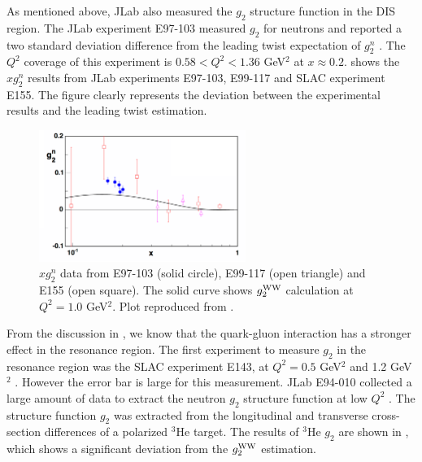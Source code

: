 As mentioned above, JLab also measured the $g_2$ structure function in the DIS region. The JLab experiment E97-103 measured $g_2$ for neutrons and reported a two standard deviation difference from the leading twist expectation of $g_2^n$ \cite{Kramer2005}. The $Q^2$ coverage of this experiment is $0.58<Q^2<1.36$ GeV${}^2$ at $x\approx0.2$.  shows the $xg_2^n$ results from JLab experiments E97-103, E99-117 \cite{Zheng2004} and SLAC experiment E155. The figure clearly represents the deviation between the experimental results and the leading twist estimation.

\begin{figure}[tb!]
  \centering
  \includegraphics[width=0.6\textwidth]{figs/xg2n_E97103.png}
  \caption[$xg_2^n$ data from E97-103.]{$xg_2^n$ data from E97-103 (solid circle), E99-117 (open triangle) and E155 (open square). The solid curve shows $g_2^{\mathrm{WW}}$ calculation at $Q^2=1.0$ GeV${}^2$. Plot reproduced from \cite{Kramer2005}. \label{C4S1F2}}
\end{figure}

From the discussion in , we know that the quark-gluon interaction has a stronger effect in the resonance region. The first experiment to measure $g_2$ in the resonance region was the SLAC experiment E143, at $Q^2=0.5$ GeV${}^2$ and 1.2 GeV${}^2$ \cite{Abe1998}. However the error bar is large for this measurement. JLab E94-010 collected a large amount of data to extract the neutron $g_2$ structure function at low $Q^2$ \cite{Amarian2004a}. The structure function $g_2$ was extracted from the longitudinal and transverse cross-section differences of a polarized ${}^3$He target. The results of ${}^3$He $g_2$ are shown in , which shows a significant deviation from the $g_2^{\mathrm{WW}}$ estimation.

